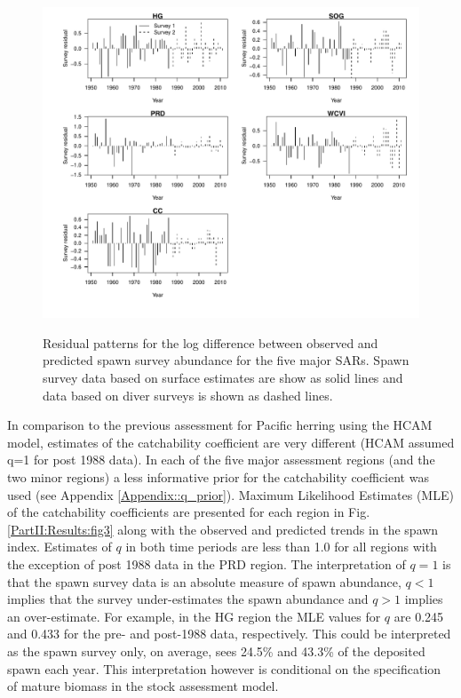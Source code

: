 \begin{figure}[!tbp]
	\includegraphics[width=\textwidth]{../FIGS/qPriorFigs/iscam_fig_surveyresid.pdf}\\
	\caption{Residual patterns for the log difference between observed and predicted spawn survey abundance for the five major SARs. Spawn survey data based on surface estimates are show as solid lines and data based on diver surveys is shown as dashed lines.}\label{PartII:Results:fig2}
\end{figure}

In comparison to the previous assessment for Pacific herring using the HCAM model, estimates of the catchability coefficient are very different (HCAM assumed q=1 for post 1988 data).  In each of the five major assessment regions (and the two minor regions) a less informative prior for the catchability coefficient was used (see Appendix \ref{Appendix::q_prior}).  Maximum Likelihood Estimates (MLE) of the catchability coefficients are presented for each region in Fig. \ref{PartII:Results:fig3} along with the observed and predicted trends in the spawn index.  Estimates of $q$ in both time periods are less than 1.0 for all regions with the exception of post 1988 data in the PRD region.  The interpretation of $q=1$ is that the spawn survey data is an absolute measure of spawn abundance, $q<1$ implies that the survey under-estimates the spawn abundance and $q>1$ implies an over-estimate.  For example, in the HG region the MLE values for $q$ are 0.245 and 0.433 for the pre- and post-1988 data, respectively. This could be interpreted as the spawn survey only, on average, sees 24.5\% and 43.3\% of the deposited spawn each year.  This interpretation however is conditional on the specification of mature biomass in the stock assessment model. 

